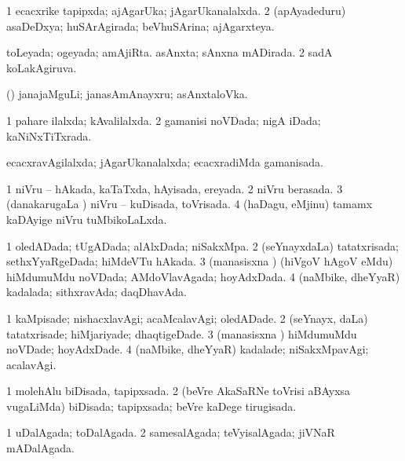 \bentry
{} 
\gl{\gu}
\expl{}
\bmng
\bnum
\num{1} ecacxrike tapipxda; ajAgarUka; jAgarUkanalalxda. 
\num{2} (apAyadeduru) asaDeDxya; huSArAgirada; beVhuSArina; ajAgarxteya. 
\enum
\emng
\eentry

\bentry
{} 
\gl{\gu}
\expl{}
\bmng
\bnum
{} 
\banum
{} toLeyada; ogeyada; amAjiRta. 
 asAnxta; sAnxna mADirada. 
\eanum
\numie
\num{2} sadA koLakAgiruva. 
\enum
\emng

\noindent
\gl{\pagu}
\expl{}
\bmng
{} (\AmA) janajaMguLi; janasAmAnayxru; asAnxtaloVka. 
\emng
\eentry

\bentry 
{} 
\gl{\gu}
\expl{}
\bmng
\bnum
\num{1} pahare ilalxda; kAvalilalxda. 
\num{2} gamanisi noVDada; nigA iDada; kaNiNxTiTxrada. 
\enum
\emng
\eentry

\bentry
{} 
\gl{\gu}
\expl{}
\bmng
ecacxravAgilalxda; jAgarUkanalalxda; ecacxradiMda gamanisada. 
\emng
\eentry

\bentry
{} 
\gl{\gu}
\expl{}
\bmng
\bnum
\num{1} niVru -- hAkada, kaTaTxda, hAyisada, ereyada. 
\num{2} niVru berasada. 
\num{3} (danakarugaLa \vi) niVru -- kuDisada, toVrisada. 
\num{4} (haDagu, eMjinu) tamamx kaDAyige niVru tuMbikoLaLxda. 
\enum
\emng
\eentry

\bentry
{} 
\gl{\gu}
\expl{}
\bmng
\bnum
\num{1} oledADada; tUgADada; alAlxDada; niSakxMpa. 
\num{2} (seYnayxdaLa) tatatxrisada; sethxYyaRgeDada; hiMdeVTu hAkada. 
\num{3} (manasisxna \vi) (hiVgoV hAgoV eMdu) hiMdumuMdu noVDada; AMdoVlavAgada; hoyAdxDada. 
\num{4} (naMbike, dheYyaR) kadalada; sithxravAda; daqDhavAda. 
\enum
\emng
\eentry

\bentry
{} 
\gl{\kirxvi}
\expl{}
\bmng
\bnum
\num{1} kaMpisade; nishacxlavAgi; acaMcalavAgi; oledADade. 
\num{2} (seYnayx, daLa) tatatxrisade; hiMjariyade; dhaqtigeDade. 
\num{3} (manasisxna \vi) hiMdumuMdu noVDade; hoyAdxDade. 
\num{4} (naMbike, dheYyaR) kadalade; niSakxMpavAgi; acalavAgi. 
\enum
\emng
\eentry

\bentry
{} 
\gl{\gu}
\expl{}
\bmng
\bnum
\num{1} molehAlu biDisada, tapipxsada. 
\num{2} (beVre AkaSaRNe toVrisi aBAyxsa \mo vugaLiMda) biDisada; tapipxsada; beVre kaDege tirugisada. 
\enum
\emng
\eentry

\bentry
{} 
\gl{\gu}
\expl{}
\bmng
\bnum
\num{1} uDalAgada; toDalAgada. 
\num{2} samesalAgada; teVyisalAgada; jiVNaR mADalAgada. 
\enum
\emng
\eentry

